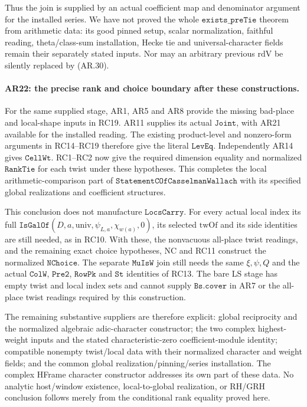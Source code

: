 Thus the join is supplied by an actual coefficient map and
denominator argument for the installed series. We have not proved
the whole $\texttt{exists\_preTie}$ theorem from arithmetic data:
its good pinned setup, scalar normalization, faithful reading,
theta/class-sum installation, Hecke tie and universal-character
fields remain their separately stated inputs. Nor may an arbitrary
previous $\mathrm{rdV}$ be silently replaced by (AR.30).

\paragraph{AR22: the precise rank and choice boundary after these constructions.}
For the same supplied stage, AR1, AR5 and AR8 provide the missing
bad-place and local-shape inputs in RC19. AR11 supplies its actual
$\texttt{Joint}$, with AR21 available for the installed reading.
The existing product-level and nonzero-form arguments in RC14--RC19
therefore give the literal $\texttt{LevEq}$. Independently AR14
gives $\texttt{CellWt}$. RC1--RC2 now give the required dimension
equality and normalized $\texttt{RankTie}$ for each twist under
these hypotheses. This completes the local arithmetic-comparison
part of $\texttt{StatementCOfCasselmanWallach}$ with its specified
global realizations and coefficient structures.

This conclusion does not manufacture $\texttt{LocsCarry}$.
For every actual local index its full
$\texttt{IsGalOf}(D,a,\mathrm{univ},\psi_{L,a},\chi_{w(a)},0)$,
its selected $\mathrm{twOf}$ and its side identities are still needed,
as in RC10. With these, the nonvacuous all-place twist readings,
and the remaining exact choice hypotheses, NC and RC11 construct
the normalized $\texttt{NChoice}$. The separate
$\texttt{MuIsW}$ join still needs the same $\xi,\psi,Q$ and the
actual $\texttt{ColW}$, $\texttt{Pre2}$, $\texttt{RowPk}$ and
$\texttt{St}$ identities of RC13.
The bare LS stage has empty twist and local index sets and cannot
supply $\texttt{Bs.cover}$ in AR7 or the all-place twist readings
required by this construction.

The remaining substantive suppliers are therefore explicit:
global reciprocity and the normalized algebraic adic-character
constructor; the two complex highest-weight inputs and the stated
characteristic-zero coefficient-module identity; compatible
nonempty twist/local data with their normalized character and
weight fields; and the common global realization/pinning/series
installation. The complex HFrame character constructor addresses
its own part of these data. No analytic host/window existence,
local-to-global realization, or RH/GRH conclusion follows merely
from the conditional rank equality proved here.
